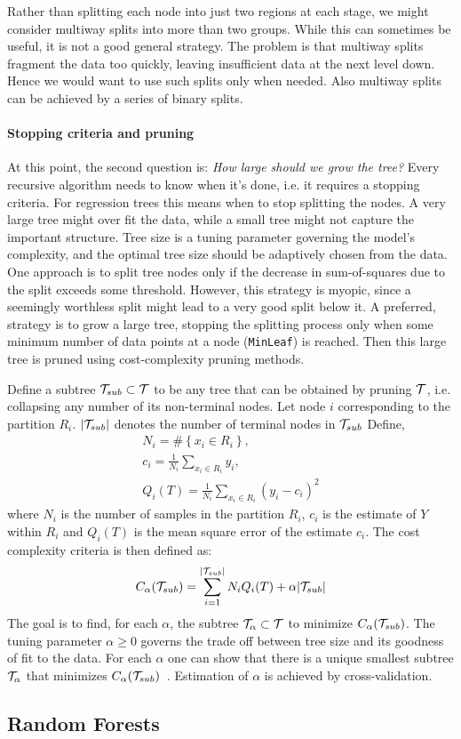 Rather than splitting each node into just two regions at each stage, we might consider multiway splits into more than two groups. 
While this can sometimes be useful, it is not a good general strategy. The problem is that multiway splits fragment the data too quickly, leaving insufficient data at the next level down. 
Hence we would want to use such splits only when needed. 
Also multiway splits can be achieved by a series of binary splits.

\paragraph{Stopping criteria and pruning}
At this point, the second question is: \emph{How large should we grow the tree?}
Every recursive algorithm needs to know when it's done, i.e. it requires a stopping criteria. 
For regression trees this means when to stop splitting the nodes. 
A very large tree might over fit the data, while a small tree might not capture the important structure.
Tree size is a tuning parameter governing the model’s complexity, and the optimal tree size should be adaptively chosen from the data. 
One approach is to split tree nodes only if the decrease in sum-of-squares due to the split exceeds some threshold. 
However, this strategy is myopic, since a seemingly worthless split might lead to a very good split below it.
A preferred, strategy is to grow a large tree, stopping the splitting process only when some minimum number of data points at a node (\texttt{MinLeaf}) is reached. Then this large tree is pruned using cost-complexity pruning methods.

Define a subtree $\mathcal{T}_{sub} \subset \mathcal{T}$ to be any tree that can be obtained by pruning $\mathcal{T}$, i.e. collapsing any number of its non-terminal nodes. 
Let node $i$ corresponding to the partition $R_i$. $|\mathcal{T}_{sub}|$ denotes the number of terminal nodes in $\mathcal{T}_{sub}$
Define,
\begin{equation}
\begin{aligned}
N_i = \# \left\lbrace x_i \in R_i \right\rbrace,\\
c_i = \frac{1}{N_i} \sum_{x_i \in R_i} y_i, \\
Q_i(T) = \frac{1}{N_i} \sum_{x_i \in R_i} (y_i - c_i)^2
\end{aligned}
\end{equation}
where $N_i$ is the number of samples in the partition $R_i$, $c_i$ is the estimate of $Y$ within $R_i$ and $Q_i(T)$ is the mean square error of the estimate $c_i$. The cost complexity criteria is then defined as:
\begin{equation}
C_{\alpha}(\mathcal{T}_{sub}) = \sum_{i=1}^{|\mathcal{T}_{sub}|} N_i Q_i(T) + \alpha |\mathcal{T}_{sub}|
\end{equation}
The goal is to find, for each $\alpha$, the subtree $\mathcal{T}_{\alpha} \subset \mathcal{T}$ to minimize $C_{\alpha}(\mathcal{T}_{sub})$. 
The tuning parameter $\alpha \geq 0$ governs the trade off between tree size and its goodness of fit to the data.
For each $\alpha$ one can show that there is a unique smallest subtree $\mathcal{T}_{\alpha}$ that minimizes $C_{\alpha}(\mathcal{T}_{sub})$~\cite{Ripley96}. Estimation of $\alpha$ is achieved by cross-validation.

\subsection{Random Forests}